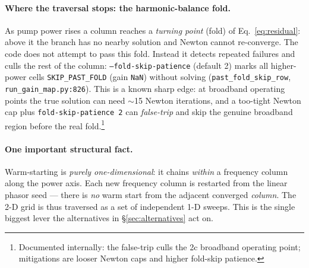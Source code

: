 \documentclass[11pt]{article}
\newcommand{\code}[1]{\texttt{\small #1}}
\begin{document}
\paragraph{Where the traversal stops: the harmonic-balance fold.}
As pump power rises a column reaches a \emph{turning point} (fold) of
Eq.~\ref{eq:residual}: above it the branch has no nearby solution and Newton
cannot re-converge. The code does not attempt to pass this fold. Instead it
detects repeated failures and culls the rest of the column:
\code{--fold-skip-patience} (default 2) marks all higher-power cells
\code{SKIP\_PAST\_FOLD} (gain \code{NaN}) without solving
(\code{past\_fold\_skip\_row}, \code{run\_gain\_map.py:826}). This is a known
sharp edge: at broadband operating points the true solution can need
$\sim$15 Newton iterations, and a too-tight Newton cap plus
\code{fold-skip-patience 2} can \emph{false-trip} and skip the genuine broadband
region before the real fold.\footnote{Documented internally: the false-trip
culls the 2c broadband operating point; mitigations are looser Newton caps and
higher fold-skip patience.}

\paragraph{One important structural fact.}
Warm-starting is \emph{purely one-dimensional}: it chains \emph{within} a
frequency column along the power axis. Each new frequency column is restarted
from the linear phasor seed --- there is \emph{no} warm start from the adjacent
converged \emph{column}. The 2-D grid is thus traversed as a set of independent
1-D sweeps. This is the single biggest lever the alternatives in
\S\ref{sec:alternatives} act on.
\end{document}
